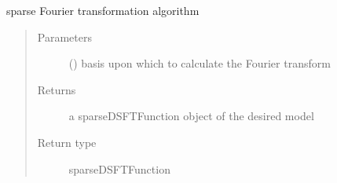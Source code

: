 \documentclass[letterpaper,10pt,english]{sphinxmanual}
\begin{document}
\begin{fulllineitems}
\begin{fulllineitems}
\end{fulllineitems}


\begin{fulllineitems}
\label{\detokenize{setFTs:setFTs.setfunctions.WrapSetFunction.transform_sparse}}
\sphinxAtStartPar
sparse Fourier transformation algorithm
\begin{quote}\begin{description}
\item[{Parameters}] \leavevmode
\sphinxAtStartPar
{} () \textendash{} basis upon which to calculate the Fourier transform

\item[{Returns}] \leavevmode
\sphinxAtStartPar
a sparseDSFTFunction object of the desired model

\item[{Return type}] \leavevmode
\sphinxAtStartPar
sparseDSFTFunction

\end{description}\end{quote}

\end{fulllineitems}


\end{fulllineitems}

\end{document}
